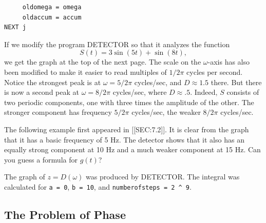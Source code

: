 {{{{\vspace{-13pt}
\begin{verbatim}
     oldomega = omega
     oldaccum = accum
NEXT j
\end{verbatim}
\normalsize
\bigskip

	If we modify the program DETECTOR so that it analyzes the function
	\[
S(t) = 3\sin(5t) + \sin(8t),
\]
we get the graph at the top of the next page.  The scale on the $\omega$-axis has also been modified to make it easier to read multiples of $1/2\pi$ cycles per second.  Notice the strongest peak is at $\omega = 5/2\pi$ cycles/sec, and $D \approx 1.5$ there.  But there is now a second peak at $\omega = 8/2\pi$ cycles/sec, where $D \approx .5$.  Indeed, $S$ consists of two periodic components, one with three times the amplitude of the other.  The stronger component has frequency $5/2\pi$ cycles/sec, the weaker $8/2\pi$ cycles/sec.
\vspace{95pt}


\vspace{50pt}

	The following example first appeared in [[SEC:7.2]].  It is clear from the graph that it has a basic frequency of 5 Hz.  The detector shows that it also has an equally strong component at 10 Hz and a much weaker component at 15 Hz.  
Can you guess a formula for $g(t)$?
\vspace{75pt}

 
\vspace{140pt}


\vspace{50pt}

\noindent
The graph of $z = D(\omega)$ was produced by DETECTOR.  The integral was calculated for {\tt a = 0}, {\tt b = 10}, and {\tt numberofsteps = 2 \verb+^+ 9}.    


\subsection{The Problem of Phase}

}}}}
